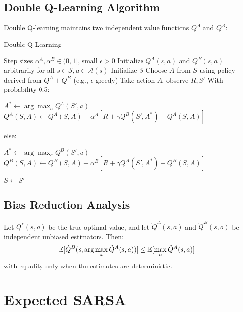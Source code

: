 \subsection{Double Q-Learning Algorithm}

Double Q-learning maintains two independent value functions $Q^A$ and $Q^B$:

\begin{algorithm}
\caption{Double Q-Learning}
\begin{algorithmic}
\REQUIRE Step sizes $\alpha^A, \alpha^B \in (0,1]$, small $\epsilon > 0$
\STATE Initialize $Q^A(s,a)$ and $Q^B(s,a)$ arbitrarily for all $s \in \mathcal{S}, a \in \mathcal{A}(s)$
\REPEAT
    \STATE Initialize $S$
    \REPEAT
        \STATE Choose $A$ from $S$ using policy derived from $Q^A + Q^B$ (e.g., $\epsilon$-greedy)
        \STATE Take action $A$, observe $R, S'$
        \STATE With probability 0.5:
        \begin{ALC@g}
            \STATE $A^* \leftarrow \arg\max_a Q^A(S', a)$
            \STATE $Q^A(S, A) \leftarrow Q^A(S, A) + \alpha^A [R + \gamma Q^B(S', A^*) - Q^A(S, A)]$
        \end{ALC@g}
        \STATE else:
        \begin{ALC@g}
            \STATE $A^* \leftarrow \arg\max_a Q^B(S', a)$
            \STATE $Q^B(S, A) \leftarrow Q^B(S, A) + \alpha^B [R + \gamma Q^A(S', A^*) - Q^B(S, A)]$
        \end{ALC@g}
        \STATE $S \leftarrow S'$
\end{algorithmic}
\end{algorithm}

\subsection{Bias Reduction Analysis}

\begin{theorem}
Let $Q^*(s,a)$ be the true optimal value, and let $\hat{Q}^A(s,a)$ and $\hat{Q}^B(s,a)$ be independent unbiased estimators. Then:
\begin{equation}
\mathbb{E}[\hat{Q}^B(s, \arg\max_a \hat{Q}^A(s,a))] \leq \mathbb{E}[\max_a \hat{Q}^A(s,a)]
\end{equation}
with equality only when the estimates are deterministic.
\end{theorem}

\section{Expected SARSA}

